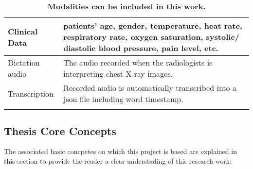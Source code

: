 \begin{longtable}{|m{10em}|m{30em}|}
    Clinical Data  \citep{Johnson2021MIMIC_IV} \citep{Johnson2021MIMIC_IV_ED}          &
    patients' age, gender, temperature, heat rate, respiratory rate, oxygen saturation, systolic/ diastolic blood pressure, pain level, etc.                                                \\ \hline
    Dictation audio \citep{Karargyris2020EyeGazeDataset}                               & The audio recorded when the radiologists is interpreting chest X-ray images.
    \\ \hline
    Transcription \citep{Karargyris2020EyeGazeDataset} \citep{Lanfredi2021REFLACX}     & Recorded audio is automatically transcribed into a json file including word timestamp.             \\ \hline
    \caption{\textbf{Modalities can be included in this work.}} %
    \label{tab:modalities_table}
\end{longtable}


\subsection{Thesis Core Concepts}
The associated basic concpetes on which this project is based are explained in this section to provide the reader a clear understading of this research work:

